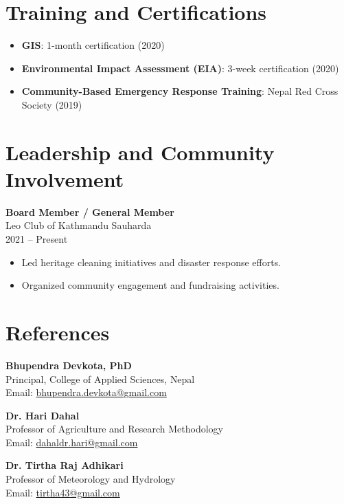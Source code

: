 \documentclass[a4paper,10pt]{article}
\begin{document}
\section*{Training and Certifications}
\begin{itemize}
    \item \textbf{GIS}: 1-month certification (2020)
    \item \textbf{Environmental Impact Assessment (EIA)}: 3-week certification (2020)
    \item \textbf{Community-Based Emergency Response Training}: Nepal Red Cross Society (2019)
\end{itemize}

\vspace{0.2cm}

\section*{Leadership and Community Involvement}
\noindent
\textbf{Board Member / General Member} \\
Leo Club of Kathmandu Sauharda \\
2021 – Present \\
\begin{itemize}
    \item Led heritage cleaning initiatives and disaster response efforts.
    \item Organized community engagement and fundraising activities.
\end{itemize}

\vspace{0.2cm}

\section*{References}
\noindent
\textbf{Bhupendra Devkota, PhD} \\
Principal, College of Applied Sciences, Nepal \\
Email: \href{mailto:bhupendra.devkota@gmail.com}{bhupendra.devkota@gmail.com}

\vspace{0.2cm}

\noindent
\textbf{Dr. Hari Dahal} \\
Professor of Agriculture and Research Methodology \\
Email: \href{mailto:dahaldr.hari@gmail.com}{dahaldr.hari@gmail.com}

\vspace{0.2cm}

\noindent
\textbf{Dr. Tirtha Raj Adhikari} \\
Professor of Meteorology and Hydrology \\
Email: \href{mailto:tirtha43@gmail.com}{tirtha43@gmail.com}
\end{document}
